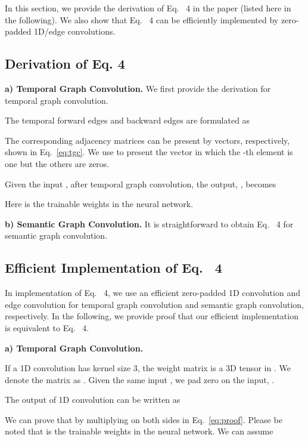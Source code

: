 \documentclass[10pt,twocolumn,letterpaper]{article}
\begin{document}
In this section, we provide the derivation of Eq.~{\color{red} 4} in the paper (listed here in the following). We also show that Eq.~{\color{red} 4} can be  efficiently implemented by zero-padded 1D/edge convolutions. \newline





\noindent
\subsection{Derivation of Eq. 4}





\noindent
\textbf{a) Temporal Graph Convolution.} We first provide the derivation for temporal graph convolution.

The temporal forward edges  and backward edges  are formulated as


The corresponding adjacency matrices  can be present by  vectors, respectively, shown in Eq.~\ref{eq:tgc}. We use  to present the vector in which the -th element is one but the others are zeros. 


Given the input , after temporal graph convolution, the output, , becomes

Here  is the trainable weights in the neural network. 


\noindent
\textbf{b) Semantic Graph Convolution.}  It is straightforward to obtain Eq.~{\color{red} 4} for semantic graph convolution.


\noindent
\subsection{Efficient Implementation of Eq.~{\color{red} 4}}

In implementation of Eq.~{\color{red} 4}, we use an efficient zero-padded 1D convolution and edge convolution for temporal graph convolution and semantic graph convolution, respectively. In the following, we provide proof that our efficient implementation is equivalent to Eq.~{\color{red} 4}.

\noindent
\textbf{a) Temporal Graph Convolution.}


If a 1D convolution has kernel size 3, the weight matrix is a 3D tensor in . We denote the matrix as . 
Given the same input , we pad zero on the input, . 

The output of 1D convolution can be written as   


We can prove that  by multiplying  on both sides in Eq.~\ref{eq:proof}.  Please be noted that  is the trainable weights in the neural network. We can assume 
\end{document}
